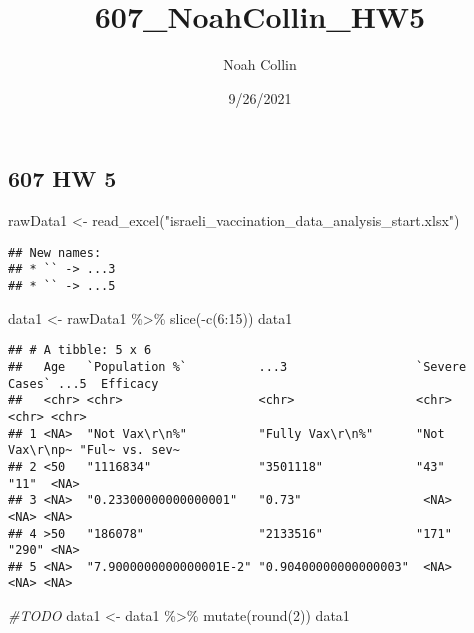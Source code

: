 \documentclass[
]{article}
\title{607\_NoahCollin\_HW5}
\author{Noah Collin}
\date{9/26/2021}
\newenvironment{Shaded}{\begin{snugshade}}{\end{snugshade}}
\newcommand{\CommentTok}[1]{\textcolor[rgb]{0.56,0.35,0.01}{\textit{#1}}}
\newcommand{\DecValTok}[1]{\textcolor[rgb]{0.00,0.00,0.81}{#1}}
\newcommand{\FunctionTok}[1]{\textcolor[rgb]{0.00,0.00,0.00}{#1}}
\newcommand{\NormalTok}[1]{#1}
\newcommand{\OtherTok}[1]{\textcolor[rgb]{0.56,0.35,0.01}{#1}}
\newcommand{\SpecialCharTok}[1]{\textcolor[rgb]{0.00,0.00,0.00}{#1}}
\newcommand{\StringTok}[1]{\textcolor[rgb]{0.31,0.60,0.02}{#1}}
\begin{document}
\maketitle

\hypertarget{hw-5}{%
\subsection{607 HW 5}\label{hw-5}}

\begin{Shaded}
\begin{Highlighting}[]
\NormalTok{rawData1 }\OtherTok{\textless{}{-}}  \FunctionTok{read\_excel}\NormalTok{(}\StringTok{"israeli\_vaccination\_data\_analysis\_start.xlsx"}\NormalTok{)}
\end{Highlighting}
\end{Shaded}

\begin{verbatim}
## New names:
## * `` -> ...3
## * `` -> ...5
\end{verbatim}

\begin{Shaded}
\begin{Highlighting}[]
\NormalTok{data1 }\OtherTok{\textless{}{-}}\NormalTok{ rawData1 }\SpecialCharTok{\%\textgreater{}\%} \FunctionTok{slice}\NormalTok{(}\SpecialCharTok{{-}}\FunctionTok{c}\NormalTok{(}\DecValTok{6}\SpecialCharTok{:}\DecValTok{15}\NormalTok{))}
\NormalTok{data1}
\end{Highlighting}
\end{Shaded}

\begin{verbatim}
## # A tibble: 5 x 6
##   Age   `Population %`          ...3                  `Severe Cases` ...5  Efficacy
##   <chr> <chr>                   <chr>                 <chr>          <chr> <chr>   
## 1 <NA>  "Not Vax\r\n%"          "Fully Vax\r\n%"      "Not Vax\r\np~ "Ful~ vs. sev~
## 2 <50   "1116834"               "3501118"             "43"           "11"  <NA>    
## 3 <NA>  "0.23300000000000001"   "0.73"                 <NA>           <NA> <NA>    
## 4 >50   "186078"                "2133516"             "171"          "290" <NA>    
## 5 <NA>  "7.9000000000000001E-2" "0.90400000000000003"  <NA>           <NA> <NA>
\end{verbatim}

\begin{Shaded}
\begin{Highlighting}[]
\CommentTok{\#TODO}
\NormalTok{data1 }\OtherTok{\textless{}{-}}\NormalTok{ data1 }\SpecialCharTok{\%\textgreater{}\%} \FunctionTok{mutate}\NormalTok{(}\FunctionTok{round}\NormalTok{(}\DecValTok{2}\NormalTok{))}
\NormalTok{data1}
\end{Highlighting}
\end{Shaded}
\end{document}
